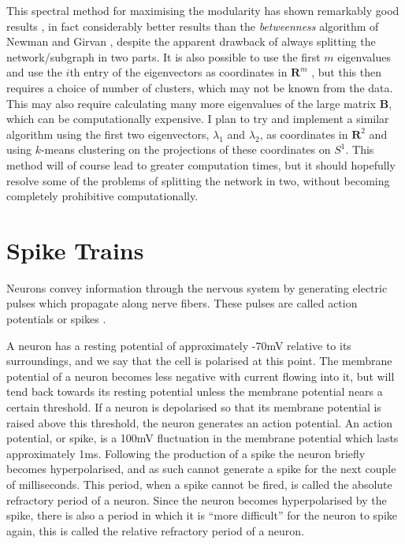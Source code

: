 This spectral method for maximising the modularity has shown
remarkably good results \cite{Newman2006a}, in fact considerably better results
than the {\sl betweenness} algorithm of Newman and Girvan 
\cite{NewmanGirvan2004a}, despite the apparent drawback of always splitting the 
network/subgraph in two parts. It is also possible to use the first $m$ 
eigenvalues and use the $i$th entry of the eigenvectors as coordinates in 
$\mathbf{R}^{m}$ \cite{Humphries2011a}, but this then requires a choice of 
number of clusters, which may not be known from the data.  This may also 
require calculating many more eigenvalues of the large matrix $\mathbf{B}$, 
which can be computationally expensive.  I plan to try and implement a similar 
algorithm using the first two eigenvectors, $\lambda_1$ and $\lambda_2$, as 
coordinates in $\mathbf{R}^2$ and using $k$-means clustering on the projections 
of these coordinates on $S^1$.  This method will of course lead to greater 
computation times, but it should hopefully resolve some of the problems of 
splitting the network in two, without becoming completely prohibitive 
computationally.

\section{Spike Trains}

Neurons convey information through the nervous system by generating
electric pulses which propagate along nerve fibers.  These pulses are
called action potentials or spikes \cite{DayanAbbott2001a}. 

A neuron has a resting potential of approximately -70mV relative to
its surroundings, and we say that the cell is polarised at this point.
The membrane potential of a neuron becomes less negative with current
flowing into it, but will tend back towards its resting potential
unless the membrane potential nears a certain threshold. If a neuron
is depolarised so that its membrane potential is raised above this
threshold, the neuron generates an action potential. An action potential, or 
spike, is a 100mV fluctuation in the membrane potential which lasts 
approximately 1ms. Following the production of a spike the neuron briefly 
becomes hyperpolarised, and as such cannot generate a spike for the next
couple of milliseconds.  This period, when a spike cannot be fired, is
called the absolute refractory period of a neuron.  Since the neuron
becomes hyperpolarised by the spike, there is also a period in which
it is ``more difficult'' for the neuron to spike again, this is called
the relative refractory period of a neuron. 

